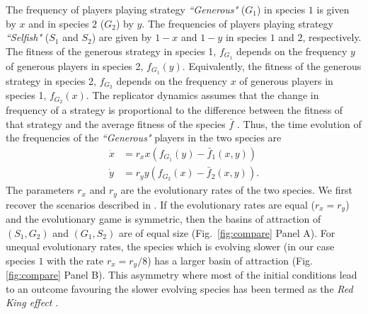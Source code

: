 \documentclass[aps,pre,amsfonts,floatfix, onecolumn,showkeys]{revtex4-1}
\begin{document}
The frequency of players playing strategy \textit{``Generous"} ($G_1$) in species $1$ is given by $x$ and in species $2$ ($G_2$) by $y$.
The frequencies of players playing strategy \textit{``Selfish"} ($S_1$ and $S_2$) are given by $1-x$ and $1-y$ in species $1$ and $2$, respectively.
The fitness of the generous strategy in species 1, $f_{G_1}$ depends on the frequency $y$ of generous players in species 2, $f_{G_1}(y)$. Equivalently, the fitness of the generous strategy in species 2, $f_{G_2}$ depends on the frequency $x$ of generous players in species 1, $f_{G_2}(x)$. 
The replicator dynamics assumes that the change in frequency of a strategy is proportional to the difference between the fitness of that strategy and the average fitness of the species $\bar{f}$
 \cite{taylor:MB:1978,hofbauer:book:1998,hofbauer:BAMS:2003}. Thus, the time evolution of the frequencies of the \textit{``Generous"} players in the two species are 
%
\begin{eqnarray}
\dot{x} &= r_x x \left(f_{G_1}(y) -  \bar{f}_1(x,y) \right) \nonumber \\
\dot{y} &= r_y y \left(f_{G_2}(x) -  \bar{f}_2(x,y) \right).
\label{eq:orirepeqs}
\end{eqnarray}
%
The parameters $r_x$ and $r_y$ are the evolutionary rates of the two species.
We first recover the scenarios described in \cite{bergstrom:PNAS:2003}.
If the evolutionary rates are equal ($r_x=r_y$) and the evolutionary game is symmetric, then the basins of attraction of $(S_1, G_2)$ and $(G_1, S_2)$ are of equal size (Fig.\ \ref{fig:compare} Panel A).
For unequal evolutionary rates, the species which is evolving slower (in our case species $1$ with the rate $r_x=r_y/8$) has a larger basin of attraction (Fig. \ref{fig:compare} Panel B).
This asymmetry where most of the initial conditions lead to an outcome favouring the slower evolving species  has been termed as the \textit{Red King effect} \cite{bergstrom:PNAS:2003}.
\end{document}
